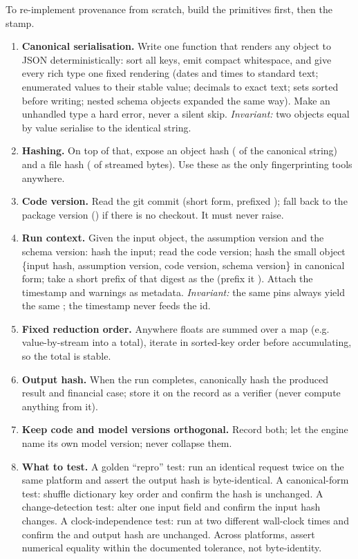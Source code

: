 \begin{rebuild}
To re-implement provenance from scratch, build the primitives first, then the stamp.
\begin{enumerate}
  \item \textbf{Canonical serialisation.} Write one function that renders any object to JSON deterministically: sort all keys, emit compact whitespace, and give every rich type one fixed rendering (dates and times to standard text; enumerated values to their stable value; decimals to exact text; sets sorted before writing; nested schema objects expanded the same way). Make an unhandled type a hard error, never a silent skip. \emph{Invariant:} two objects equal by value serialise to the identical string.
  \item \textbf{Hashing.} On top of that, expose an object hash ( of the canonical string) and a file hash ( of streamed bytes). Use these as the only fingerprinting tools anywhere.
  \item \textbf{Code version.} Read the git commit (short form, prefixed ); fall back to the package version () if there is no checkout. It must never raise.
  \item \textbf{Run context.} Given the input object, the assumption version and the schema version: hash the input; read the code version; hash the small object \{input hash, assumption version, code version, schema version\} in canonical form; take a short prefix of that digest as the  (prefix it ). Attach the timestamp and warnings as metadata. \emph{Invariant:} the same pins always yield the same ; the timestamp never feeds the id.
  \item \textbf{Fixed reduction order.} Anywhere floats are summed over a map (e.g. value-by-stream into a total), iterate in sorted-key order before accumulating, so the total is stable.
  \item \textbf{Output hash.} When the run completes, canonically hash the produced result and financial case; store it on the record as a verifier (never compute anything from it).
  \item \textbf{Keep code and model versions orthogonal.} Record both; let the engine name its own model version; never collapse them.
  \item \textbf{What to test.} A golden ``repro'' test: run an identical request twice on the same platform and assert the output hash is byte-identical. A canonical-form test: shuffle dictionary key order and confirm the hash is unchanged. A change-detection test: alter one input field and confirm the input hash changes. A clock-independence test: run at two different wall-clock times and confirm the  and output hash are unchanged. Across platforms, assert numerical equality within the documented tolerance, not byte-identity.
\end{enumerate}
\end{rebuild}

